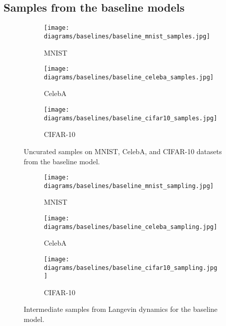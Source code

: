 \documentclass{article}
\begin{document}
\subsection{Samples from the baseline models}\label{app:baseline}
\vspace*{\fill}
\FloatBarrier
\begin{figure}[H]
    \centering
    \begin{subfigure}[b]{0.3\textwidth}
        \texttt{[image: diagrams/baselines/baseline\_mnist\_samples.jpg]}
        \caption{MNIST}
        \label{fig:baseline_mnist}
    \end{subfigure}
    \begin{subfigure}[b]{0.3\textwidth}
        \texttt{[image: diagrams/baselines/baseline\_celeba\_samples.jpg]}
        \caption{CelebA}
        \label{fig:baseline_celeba}
    \end{subfigure}
    \begin{subfigure}[b]{0.3\textwidth}
        \texttt{[image: diagrams/baselines/baseline\_cifar10\_samples.jpg]}
        \caption{CIFAR-10}
        \label{fig:baseline_cifar10}
    \end{subfigure}
    \caption{Uncurated samples on MNIST, CelebA, and CIFAR-10 datasets from the baseline model.}
    \label{fig:baseline_samples}
\end{figure}

\begin{figure}[H]
    \centering
    \begin{subfigure}[b]{0.3\textwidth}
        \texttt{[image: diagrams/baselines/baseline\_mnist\_sampling.jpg]}
        \caption{MNIST}
        \label{fig:baseline_mnist_p}
    \end{subfigure}
    \begin{subfigure}[b]{0.3\textwidth}
        \texttt{[image: diagrams/baselines/baseline\_celeba\_sampling.jpg]}
        \caption{CelebA}
        \label{fig:baseline_celeba_p}
    \end{subfigure}
    \begin{subfigure}[b]{0.3\textwidth}
        \texttt{[image: diagrams/baselines/baseline\_cifar10\_sampling.jpg]}
        \caption{CIFAR-10}
        \label{fig:baseline_cifar10_p}
    \end{subfigure}
    \caption{Intermediate samples from Langevin dynamics for the baseline model.}
    \label{fig:baseline_samples_procedure}
\end{figure}
\FloatBarrier
\vfill
\newpage
\end{document}
